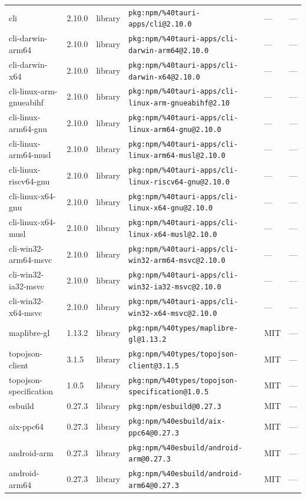 \documentclass[11pt]{article}
\begin{document}
\begin{longtable}{|l|l|l|p{2.2cm}|l|p{4cm}|}
cli & 2.10.0 & library & \texttt{pkg:npm/\%40tauri-apps/cli@2.10.0} & — & — \\
cli-darwin-arm64 & 2.10.0 & library & \texttt{pkg:npm/\%40tauri-apps/cli-darwin-arm64@2.10.0} & — & — \\
cli-darwin-x64 & 2.10.0 & library & \texttt{pkg:npm/\%40tauri-apps/cli-darwin-x64@2.10.0} & — & — \\
cli-linux-arm-gnueabihf & 2.10.0 & library & \texttt{pkg:npm/\%40tauri-apps/cli-linux-arm-gnueabihf@2.10} & — & — \\
cli-linux-arm64-gnu & 2.10.0 & library & \texttt{pkg:npm/\%40tauri-apps/cli-linux-arm64-gnu@2.10.0} & — & — \\
cli-linux-arm64-musl & 2.10.0 & library & \texttt{pkg:npm/\%40tauri-apps/cli-linux-arm64-musl@2.10.0} & — & — \\
cli-linux-riscv64-gnu & 2.10.0 & library & \texttt{pkg:npm/\%40tauri-apps/cli-linux-riscv64-gnu@2.10.0} & — & — \\
cli-linux-x64-gnu & 2.10.0 & library & \texttt{pkg:npm/\%40tauri-apps/cli-linux-x64-gnu@2.10.0} & — & — \\
cli-linux-x64-musl & 2.10.0 & library & \texttt{pkg:npm/\%40tauri-apps/cli-linux-x64-musl@2.10.0} & — & — \\
cli-win32-arm64-msvc & 2.10.0 & library & \texttt{pkg:npm/\%40tauri-apps/cli-win32-arm64-msvc@2.10.0} & — & — \\
cli-win32-ia32-msvc & 2.10.0 & library & \texttt{pkg:npm/\%40tauri-apps/cli-win32-ia32-msvc@2.10.0} & — & — \\
cli-win32-x64-msvc & 2.10.0 & library & \texttt{pkg:npm/\%40tauri-apps/cli-win32-x64-msvc@2.10.0} & — & — \\
maplibre-gl & 1.13.2 & library & \texttt{pkg:npm/\%40types/maplibre-gl@1.13.2} & MIT & — \\
topojson-client & 3.1.5 & library & \texttt{pkg:npm/\%40types/topojson-client@3.1.5} & MIT & — \\
topojson-specification & 1.0.5 & library & \texttt{pkg:npm/\%40types/topojson-specification@1.0.5} & MIT & — \\
esbuild & 0.27.3 & library & \texttt{pkg:npm/esbuild@0.27.3} & MIT & — \\
aix-ppc64 & 0.27.3 & library & \texttt{pkg:npm/\%40esbuild/aix-ppc64@0.27.3} & MIT & — \\
android-arm & 0.27.3 & library & \texttt{pkg:npm/\%40esbuild/android-arm@0.27.3} & MIT & — \\
android-arm64 & 0.27.3 & library & \texttt{pkg:npm/\%40esbuild/android-arm64@0.27.3} & MIT & — \\

\end{longtable}
\end{document}
